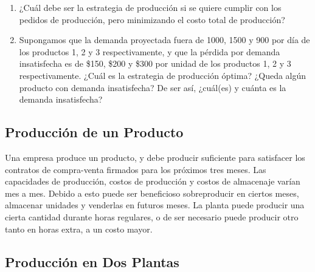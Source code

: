 \documentclass[12pt]{article}
\begin{document}
\begin{enumerate}
\item ¿Cuál debe ser la estrategia de producción si se quiere cumplir con los pedidos de producción, pero minimizando el costo total de producción?
\item Supongamos que la demanda proyectada fuera de 1000, 1500 y 900 por día de los productos 1, 2 y 3 respectivamente, y que la pérdida por demanda insatisfecha es de \$150, \$200 y \$300 por unidad de los productos 1, 2 y 3 respectivamente. ¿Cuál es la estrategia de producción óptima? ¿Queda algún producto con demanda insatisfecha? De ser así, ¿cuál(es) y cuánta es la demanda insatisfecha?
\end{enumerate}

\subsection{Producción de un Producto}

Una empresa produce un producto, y debe producir suficiente para satisfacer los contratos de compra-venta firmados para los próximos tres meses. Las capacidades de producción, costos de producción y costos de almacenaje varían mes a mes. Debido a esto puede ser beneficioso sobreproducir en ciertos meses, almacenar unidades y venderlas en futuros meses. La planta puede producir una cierta cantidad durante horas regulares, o de ser necesario puede producir otro tanto en horas extra, a un costo mayor.

\begin{center}
\end{center}

\subsection{Producción en Dos Plantas}
\end{document}
